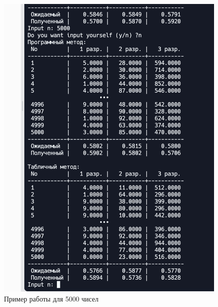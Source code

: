 \documentclass[a4paper, 12pt]{article}
\begin{document}
\begin{figure}[t!]
	\centering \includegraphics[scale=0.7]{5000}
	\centering\caption{Пример работы для 5000 чисел}
\end{figure}
\clearpage
\newpage
\clearpage
\newpage
\end{document}
